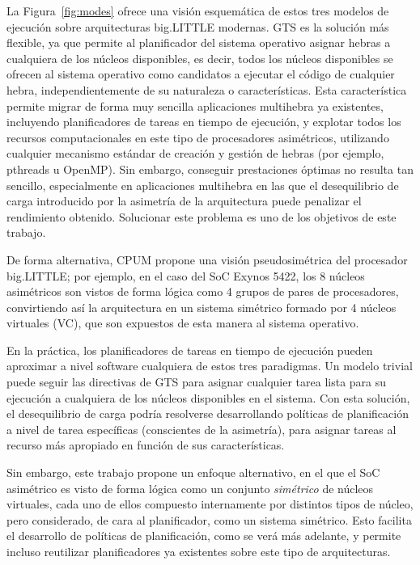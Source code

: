 La Figura~\ref{fig:modes} ofrece una visión esquemática de estos tres modelos de ejecución
sobre arquitecturas big.LITTLE modernas. GTS es la solución más flexible, ya que permite al planificador
del sistema operativo asignar hebras a cualquiera de los núcleos disponibles, es decir, todos
los núcleos disponibles se ofrecen al sistema operativo como candidatos a ejecutar el código
de cualquier hebra, independientemente de su naturaleza o características. Esta característica
permite migrar de forma muy sencilla aplicaciones multihebra ya existentes, incluyendo planificadores
de tareas en tiempo de ejecución, y explotar todos los recursos computacionales en este tipo de 
procesadores asimétricos, utilizando cualquier mecanismo estándar de creación y gestión de hebras
(por ejemplo, pthreads u OpenMP). Sin embargo, conseguir prestaciones óptimas no resulta tan
sencillo, especialmente en aplicaciones multihebra en las que el desequilibrio de carga introducido
por la asimetría de la arquitectura puede penalizar el rendimiento obtenido. Solucionar este problema
es uno de los objetivos de este trabajo.

De forma alternativa, CPUM propone una visión pseudosimétrica del procesador big.LITTLE; por ejemplo,
en el caso del SoC Exynos 5422, los 8 núcleos asimétricos son vistos de forma lógica como 4 grupos
de pares de procesadores, convirtiendo así la arquitectura en un sistema simétrico formado por
4 núcleos virtuales (VC), que son expuestos de esta manera al sistema operativo.

En la práctica, los planificadores de tareas en tiempo de ejecución pueden aproximar a nivel software
cualquiera de estos tres paradigmas. Un modelo trivial puede seguir las directivas de GTS para asignar
cualquier tarea lista para su ejecución a cualquiera de los núcleos disponibles en el sistema. Con esta
solución, el desequilibrio de carga podría resolverse desarrollando políticas de planificación a nivel
de tarea específicas (conscientes de la asimetría), para asignar tareas al recurso más apropiado en 
función de sus características. 

Sin embargo, este trabajo propone un enfoque alternativo, en el que el SoC asimétrico es visto de forma
lógica como un conjunto {\em simétrico} de núcleos virtuales, cada uno de ellos compuesto internamente
por distintos tipos de núcleo, pero considerado, de cara al planificador, como un sistema simétrico. Esto
facilita el desarrollo de políticas de planificación, como se verá más adelante, y permite incluso
reutilizar planificadores ya existentes sobre este tipo de arquitecturas.

